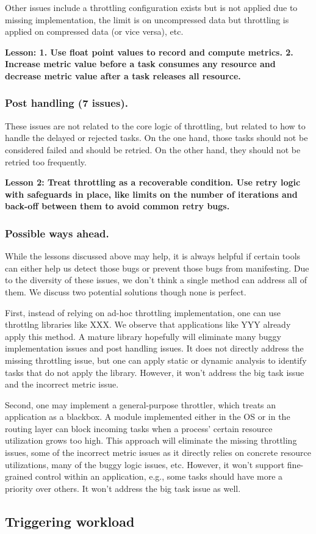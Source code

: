 Other issues include a throttling configuration exists but is not applied due to missing implementation,
the limit is on uncompressed data but throttling is applied on compressed data (or vice versa), etc.

\noindent
\textbf{Lesson: 1. Use float point values to record and compute metrics.
 2. Increase metric value before a task consumes any resource and decrease
metric value after a task releases all resource.}

\subsubsection{Post handling (7 issues).} These issues are not related to the core logic of throttling, but related
to how to handle the delayed or rejected tasks. On the one hand, those tasks should not be considered
failed and should be retried. On the other hand, they should not be retried too frequently.

\noindent
\textbf{Lesson 2: Treat throttling as a recoverable condition. Use retry logic with safeguards in place, 
like limits on the number of iterations and back-off between them to avoid common retry bugs.}

\subsubsection{Possible ways ahead.} While the lessons discussed above may help, it is always helpful
if certain tools can either help us detect those bugs or prevent those bugs from manifesting. Due to the
diversity of these issues, we don't think a single method can address all of them. We discuss two potential
solutions though none is perfect.

First, instead of relying on ad-hoc throttling implementation, one can use throttlng libraries like XXX.
We observe that applications like YYY already apply this method. A mature library hopefully will eliminate
many buggy implementation issues and post handling issues. It does not directly address the missing throttling
issue, but one can apply static or dynamic analysis to identify tasks that do not apply the library. However,
it won't address the big task issue and the incorrect metric issue.

Second, one may implement a general-purpose throttler, which treats an application as a blackbox.
A module implemented either in the OS or in the routing layer can block incoming tasks when a process'
certain resource utilization grows too high. This approach will eliminate the missing throttling issues,
some of the incorrect metric issues as it directly relies on concrete resource utilizations, many of the
buggy logic issues, etc. However, it won't support fine-grained control within an application, e.g., some
tasks should have more a priority over others. It won't address the big task issue as well.


\subsection{Triggering workload}
